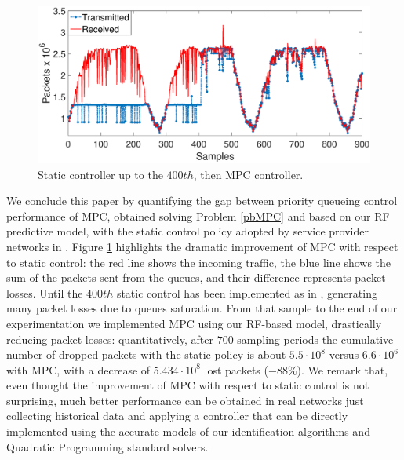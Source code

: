 \begin{figure}[h!]
\centering
\includegraphics[trim={120 0 120 0},width=0.9\linewidth]{figure/MPCfinal.eps}
\caption{Static controller up to the $400th$, then MPC controller.}
\label{fig:{MPC}}
\end{figure}

We conclude this paper by quantifying the gap between priority queueing control performance of MPC, obtained solving Problem \ref{pbMPC} and based on our RF predictive model, with the static control policy adopted by service provider networks in \cite{Notiziario}. Figure \ref{fig:{MPC}} highlights the dramatic improvement of MPC with respect to static control: the red line shows the incoming traffic, the blue line shows the sum of the packets sent from the queues, and their difference represents packet losses. Until the $400th$ static control has been implemented as in \cite{Notiziario}, generating many packet losses due to queues saturation. From that sample to the end of our experimentation we implemented MPC using our RF-based model, drastically reducing packet losses: quantitatively, after $700$ sampling periods the cumulative number of dropped packets with the static policy is about $5.5\cdot10^8$ versus $6.6\cdot10^6$ with MPC, with a decrease of $5.434\cdot10^8$ lost packets ($-88 \%$).
We remark that, even thought the improvement of MPC with respect to static control is not surprising, much better performance can be obtained in real networks just collecting historical data and applying a controller that can be directly implemented using the accurate models of our identification algorithms and Quadratic Programming standard solvers.